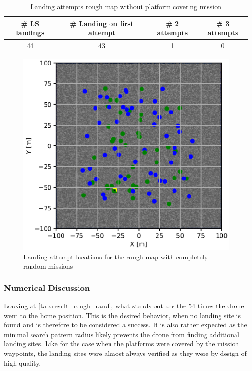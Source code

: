     \begin{table}[h]
        \begin{center}
         \caption{Landing attempts rough map without platform covering mission}\vspace{1ex}
         \label{tab:land_nums_rough_rand}
         \begin{tabular}{|c|c|c|c|}
         \hline
         \# LS landings & \# Landing on first attempt & \# 2 attempts & \# 3 attempts\\ \hline \hline
         44 & 43 & 1 & 0 \\
         \hline
         \end{tabular}
        \end{center}
    \end{table}

    \begin{figure}[h]
    \centering
    \includegraphics[scale=0.5]{images/evaluation/landing_rough_rand.png}
    \caption{Landing attempt locations for the rough map with completely random missions}
    \label{fig:land_rough_rand}
    \end{figure}

    \subsubsection{Numerical Discussion}

    Looking at \cref{tab:result_rough_rand}, what stands out are the 54 times the drone went to the home position. This is the desired behavior, when no landing site is found and is therefore to be considered a success. It is also rather expected as the minimal search pattern radius likely prevents the drone from finding additional landing sites. Like for the case when the platforms were covered by the mission waypoints, the landing sites were almost always verified as they were by design of high quality. 
    
